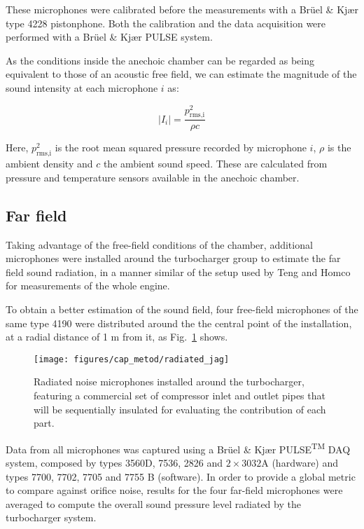 These microphones were calibrated before the measurements with a Brüel \& Kjær type 4228 pistonphone. Both the calibration and the data acquisition were performed with a Brüel \& Kjær PULSE system.

As the conditions inside the anechoic chamber can be regarded as being equivalent to those of an acoustic free field, we can estimate the magnitude of the sound intensity at each microphone $i$ as:

\begin{equation}
	|I_i| = \frac{p^2_\text{rms,i}}{\rho c}
\end{equation}

Here, $p^2_\text{rms,i}$ is the root mean squared pressure recorded by microphone $i$, $\rho$ is the ambient density and $c$ the ambient sound speed. These are calculated from pressure and temperature sensors available in the anechoic chamber.

\subsection{Far field}
\label{sub:metod_far_field}

Taking advantage of the free-field conditions of the chamber, additional microphones were installed around the turbocharger group to estimate the far field sound radiation, in a manner similar of the setup used by Teng and Homco for measurements of the whole \cite{teng2009investigation} engine.

To obtain a better estimation of the sound field, four free-field microphones of the same type 4190 were distributed around the the central point of the installation, at a radial distance of 1 m from it, as Fig.~\ref{fig:radiated_jag} shows.

\begin{figure}[b!]
\centering
\texttt{[image: figures/cap\_metod/radiated\_jag]}
\caption[Radiated noise microphones installed around the turbocharger]{Radiated noise microphones installed around the turbocharger, featuring a commercial set of compressor inlet and outlet pipes that will be sequentially insulated for evaluating the contribution of each part.}
\label{fig:radiated_jag}
\end{figure}

Data from all microphones was captured using a Brüel \& Kjær PULSE\textsuperscript{TM} DAQ system, composed by types 3560D, 7536, 2826 and $2\times 3032$A (hardware) and types 7700, 7702, 7705 and 7755 B (software). In order to provide a global metric to compare against orifice noise, results for the four far-field microphones were averaged to compute the overall sound pressure level radiated by the turbocharger system.

